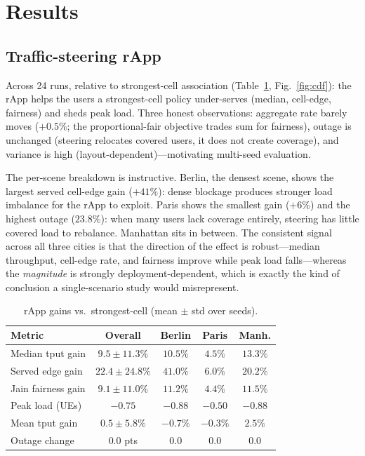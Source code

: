 \documentclass[conference]{IEEEtran}
\begin{document}
\section{Results}\label{sec:results}
\subsection{Traffic-steering rApp}
Across 24 runs, relative to strongest-cell association (Table~\ref{tab:results},
Fig.~\ref{fig:cdf}): the rApp helps the users a strongest-cell policy under-serves
(median, cell-edge, fairness) and sheds peak load. Three honest observations:
aggregate rate barely moves ($+0.5\%$; the proportional-fair objective trades sum
for fairness), outage is unchanged (steering relocates covered users, it does not
create coverage), and variance is high (layout-dependent)---motivating multi-seed
evaluation.

The per-scene breakdown is instructive. Berlin, the densest scene, shows the
largest served cell-edge gain ($+41\%$): dense blockage produces stronger
load imbalance for the rApp to exploit. Paris shows the smallest gain ($+6\%$)
and the highest outage ($23.8\%$): when many users lack coverage entirely,
steering has little covered load to rebalance. Manhattan sits in between. The
consistent signal across all three cities is that the direction of the effect is
robust---median throughput, cell-edge rate, and fairness improve while peak load
falls---whereas the \emph{magnitude} is strongly deployment-dependent, which is
exactly the kind of conclusion a single-scenario study would misrepresent.

\begin{table}[t]
\caption{rApp gains vs.\ strongest-cell (mean $\pm$ std over seeds).}
\label{tab:results}
\centering
\footnotesize
\begin{tabular}{@{}lcccc@{}}
\toprule
Metric & Overall & Berlin & Paris & Manh. \\
\midrule
Median tput gain    & $9.5\pm11.3\%$ & $10.5\%$ & $4.5\%$ & $13.3\%$ \\
Served edge gain    & $22.4\pm24.8\%$& $41.0\%$ & $6.0\%$ & $20.2\%$ \\
Jain fairness gain  & $9.1\pm11.0\%$ & $11.2\%$ & $4.4\%$ & $11.5\%$ \\
Peak load (UEs)     & $-0.75$        & $-0.88$  & $-0.50$ & $-0.88$ \\
Mean tput gain      & $0.5\pm5.8\%$  & $-0.7\%$ & $-0.3\%$& $2.5\%$ \\
Outage change       & $0.0$ pts      & $0.0$    & $0.0$   & $0.0$ \\
\bottomrule
\end{tabular}
\end{table}
\end{document}
